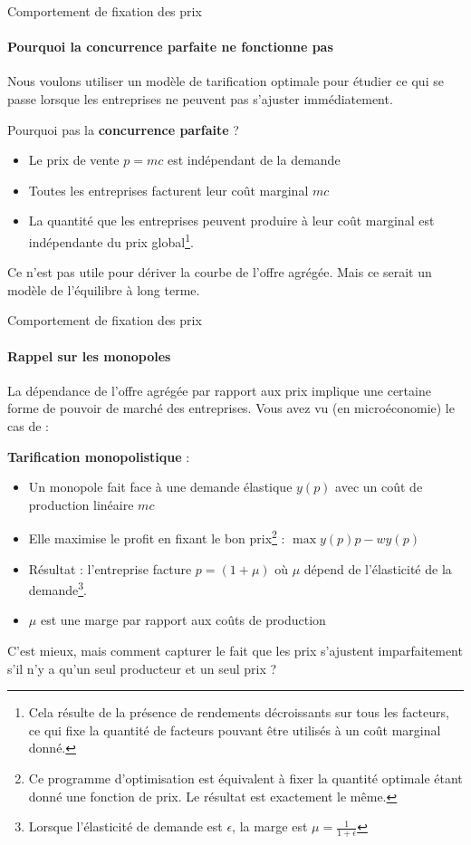 \documentclass[
  ignorenonframetext,
  aspectratio=169,
]{beamer}
\providecommand{\tightlist}{%
  \setlength{\itemsep}{0pt}\setlength{\parskip}{0pt}}\usepackage{longtable,booktabs,array}
\begin{document}
\begin{frame}{Comportement de fixation des prix}
\label{comportement-de-fixation-des-prix}
\framesubtitle{Pourquoi la concurrence parfaite ne fonctionne pas}

Nous voulons utiliser un modèle de tarification optimale pour étudier ce
qui se passe lorsque les entreprises ne peuvent pas s'ajuster
immédiatement.

Pourquoi pas la \textbf{concurrence parfaite} ?

\begin{itemize}
\tightlist
\item
  Le prix de vente \(p=mc\) est indépendant de la demande
\item
  Toutes les entreprises facturent leur coût marginal \(mc\)
\item
  La quantité que les entreprises peuvent produire à leur coût marginal
  est indépendante du prix
  global\footnote{Cela résulte de la présence de rendements décroissants sur tous les facteurs, ce qui fixe la quantité de facteurs pouvant être utilisés à un coût marginal donné.}.
\end{itemize}

Ce n'est pas utile pour dériver la courbe de l'offre agrégée. Mais ce
serait un modèle de l'équilibre à long terme.
\end{frame}

\begin{frame}{Comportement de fixation des prix}
\label{comportement-de-fixation-des-prix-1}
\framesubtitle{Rappel sur les monopoles}

La dépendance de l'offre agrégée par rapport aux prix implique une
certaine forme de pouvoir de marché des entreprises. Vous avez vu (en
microéconomie) le cas de :

\textbf{Tarification monopolistique} :

\begin{itemize}
\tightlist
\item
  Un monopole fait face à une demande élastique \(y(p)\) avec un coût de
  production linéaire \(mc\)
\item
  Elle maximise le profit en fixant le bon
  prix\footnote{Ce programme d'optimisation est équivalent à fixer la quantité optimale étant donné une fonction de prix. Le résultat est exactement le même.}
  : \(\max y(p) p - w y(p)\)
\item
  Résultat : l'entreprise facture \(p=(1+\mu)\) où \(\mu\) dépend de
  l'élasticité de la
  demande\footnote{Lorsque l'élasticité de demande est $\epsilon$, la marge est $\mu=\frac{1}{1+\epsilon}$}.
\item
  \(\mu\) est une marge par rapport aux coûts de production
\end{itemize}

C'est mieux, mais comment capturer le fait que les prix s'ajustent
imparfaitement s'il n'y a qu'un seul producteur et un seul prix ?
\end{frame}
\end{document}
